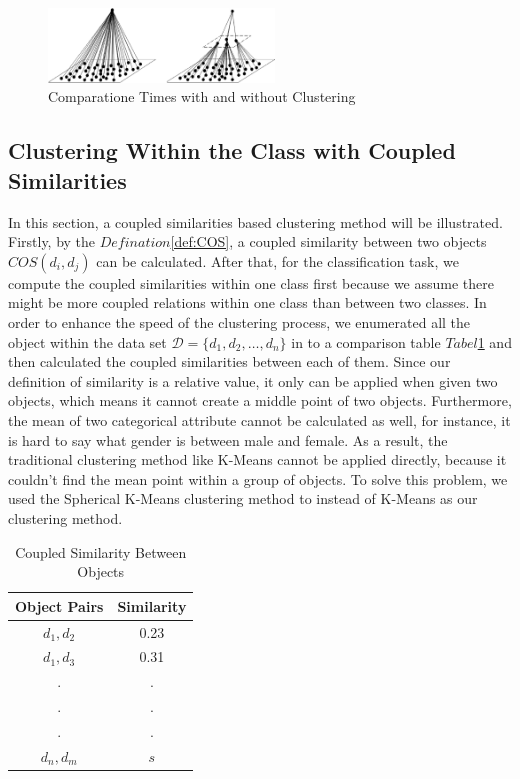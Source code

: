 \documentclass{article}
\numberwithin{equation}{section}
\begin{document}
\begin{figure}
 \centering
  \includegraphics[width=6cm]{compare.eps}
 \caption{Comparatione Times with and without Clustering}
 \label{compare}
\end{figure}

\subsection{Clustering Within the Class with Coupled Similarities}

In this section, a coupled similarities based clustering method will be illustrated. Firstly, by the $Defination$\ref{def:COS}, a coupled similarity between two objects $COS(d_i,d_j)$ can be calculated. After that, for the classification task, we compute the coupled similarities within one class first because we assume there might be more coupled relations within one class than between two classes. In order to enhance the speed of the clustering process, we enumerated all the object within the data set $\mathcal{D}=\{d_{1},d_{2},\ldots,d_{n}\}$ in to a comparison table $Tabel$\ref{tabel} and then calculated the coupled similarities between each of them. Since our definition of similarity is a relative value, it only can be applied when given two objects, which means it cannot create a middle point of two objects. Furthermore, the mean of two categorical attribute cannot be calculated as well, for instance, it is hard to say what gender is between male and female. As a result, the traditional clustering method like K-Means cannot be applied directly, because it couldn't find the mean point within a group of objects. To solve this problem, we used the Spherical K-Means clustering method to instead of K-Means as our clustering method.

\begin{table}
\caption{Coupled Similarity Between Objects}
\centering
\begin{tabular}{|c|c|}
  \hline
  Object Pairs & Similarity\\
  \hline
  $d_{1},d_{2}$ & 0.23 \\
  \hline
  $d_{1},d_{3}$ & 0.31 \\
  \hline
  . & . \\
  . & . \\
  . & . \\
  \hline
  $d_{n},d_{m}$ & $s$ \\
 \hline
\end{tabular}
\label{tabel}
\end{table}
\end{document}
